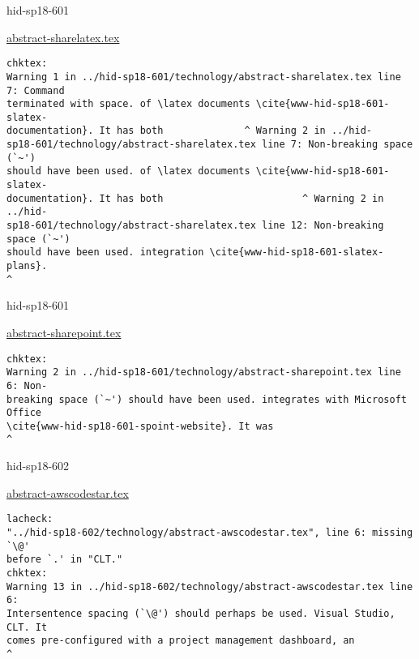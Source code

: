 \begin{IU}

hid-sp18-601

\href{https://github.com/cloudmesh-community/hid-sp18-601/blob/master//technology/abstract-sharelatex.tex}{abstract-sharelatex.tex}

\begin{tiny}
\begin{verbatim}
chktex:
Warning 1 in ../hid-sp18-601/technology/abstract-sharelatex.tex line 7: Command
terminated with space. of \latex documents \cite{www-hid-sp18-601-slatex-
documentation}. It has both              ^ Warning 2 in ../hid-
sp18-601/technology/abstract-sharelatex.tex line 7: Non-breaking space (`~')
should have been used. of \latex documents \cite{www-hid-sp18-601-slatex-
documentation}. It has both                        ^ Warning 2 in ../hid-
sp18-601/technology/abstract-sharelatex.tex line 12: Non-breaking space (`~')
should have been used. integration \cite{www-hid-sp18-601-slatex-plans}.
^
\end{verbatim}
\end{tiny}
\end{IU}



\begin{IU}

hid-sp18-601

\href{https://github.com/cloudmesh-community/hid-sp18-601/blob/master//technology/abstract-sharepoint.tex}{abstract-sharepoint.tex}

\begin{tiny}
\begin{verbatim}
chktex:
Warning 2 in ../hid-sp18-601/technology/abstract-sharepoint.tex line 6: Non-
breaking space (`~') should have been used. integrates with Microsoft Office
\cite{www-hid-sp18-601-spoint-website}. It was
^
\end{verbatim}
\end{tiny}
\end{IU}



\begin{IU}

hid-sp18-602

\href{https://github.com/cloudmesh-community/hid-sp18-602/blob/master//technology/abstract-awscodestar.tex}{abstract-awscodestar.tex}

\begin{tiny}
\begin{verbatim}
lacheck:
"../hid-sp18-602/technology/abstract-awscodestar.tex", line 6: missing `\@'
before `.' in "CLT."
chktex:
Warning 13 in ../hid-sp18-602/technology/abstract-awscodestar.tex line 6:
Intersentence spacing (`\@') should perhaps be used. Visual Studio, CLT. It
comes pre-configured with a project management dashboard, an
^
\end{verbatim}
\end{tiny}
\end{IU}

